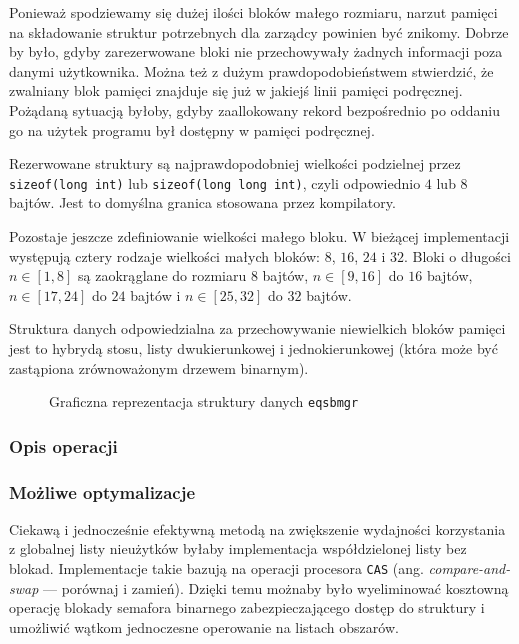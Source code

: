 \documentclass[12pt,a4paper,titlepage,twoside]{mwart}
\begin{document}
Ponieważ spodziewamy się dużej ilości bloków małego rozmiaru, narzut pamięci na
składowanie struktur potrzebnych dla zarządcy powinien być znikomy. Dobrze by
było, gdyby zarezerwowane bloki nie przechowywały żadnych informacji poza
danymi użytkownika. Można też z dużym prawdopodobieństwem stwierdzić, że
zwalniany blok pamięci znajduje się już w jakiejś linii pamięci podręcznej.
Pożądaną sytuacją byłoby, gdyby zaallokowany rekord bezpośrednio po oddaniu go
na użytek programu był dostępny w pamięci podręcznej.

Rezerwowane struktury są najprawdopodobniej wielkości podzielnej przez
\texttt{sizeof(long int)} lub \texttt{sizeof(long long int)}, czyli odpowiednio
$4$ lub $8$ bajtów. Jest to domyślna granica stosowana przez kompilatory.

Pozostaje jeszcze zdefiniowanie wielkości małego bloku. W bieżącej implementacji
występują cztery rodzaje wielkości małych bloków: $8$, $16$, $24$ i $32$. Bloki o
długości $n \in [1,8]$ są zaokrąglane do rozmiaru $8$ bajtów, $n \in [9,16]$ do
$16$ bajtów, $n \in [17,24]$ do $24$ bajtów i $n \in [25,32]$ do $32$ bajtów.

Struktura danych odpowiedzialna za przechowywanie niewielkich bloków pamięci
jest to hybrydą stosu, listy dwukierunkowej i jednokierunkowej (która może być
zastąpiona zrównoważonym drzewem binarnym).

\begin{figure}[h]
\centering
\caption{Graficzna reprezentacja struktury danych \texttt{eqsbmgr}}
\end{figure}

\subsubsection{Opis operacji}

\subsubsection{Możliwe optymalizacje}

Ciekawą i jednocześnie efektywną metodą na zwiększenie wydajności korzystania z
globalnej listy nieużytków byłaby implementacja współdzielonej listy bez
blokad. Implementacje takie bazują na operacji procesora \verb+CAS+ (ang.
\textit{compare-and-swap} --- porównaj i zamień). Dzięki temu możnaby było
wyeliminować kosztowną operację blokady semafora binarnego zabezpieczającego
dostęp do struktury i umożliwić wątkom jednoczesne operowanie na listach
obszarów.
\end{document}
